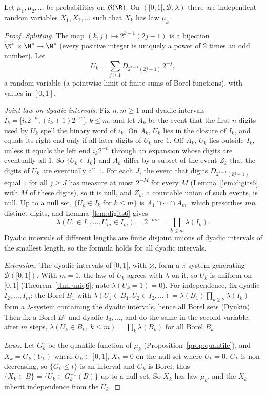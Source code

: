 \begin{theorem}\label{thm:independent}
Let $\mu_1,\mu_2,\ldots$ be probabilities on $\mathcal B(\R)$. On $([0,1[,\mathcal B,\lambda)$ there are independent random variables $X_1,X_2,\ldots$ such that $X_k$ has law $\mu_k$.
\end{theorem}
\begin{proof}
\emph{Splitting.} The map $(k,j)\mapsto2^{k-1}(2j-1)$ is a bijection $\N^*\times\N^*\to\N^*$ (every positive integer is uniquely a power of $2$ times an odd number). Let
\[U_k=\sum_{j\ge1}D_{2^{k-1}(2j-1)}\,2^{-j},\]
a random variable (a pointwise limit of finite sums of Borel functions), with values in $[0,1]$.

\emph{Joint law on dyadic intervals.} Fix $n,m\ge1$ and dyadic intervals $I_k=[i_k2^{-n},(i_k+1)2^{-n}[$, $k\le m$, and let $A_k$ be the event that the first $n$ digits used by $U_k$
spell the binary word of $i_k$. On $A_k$, $U_k$ lies in the closure of $I_k$, and equals its right end only if all later digits of $U_k$ are $1$. Off $A_k$, $U_k$ lies outside $I_k$, unless
it equals the left end $i_k2^{-n}$ through an expansion whose digits are eventually all $1$. So $\{U_k\in I_k\}$ and $A_k$ differ by a subset of the event $Z_k$ that the digits of $U_k$ are
eventually all $1$. For each $J$, the event that digits $D_{2^{k-1}(2j-1)}$ equal $1$ for all $j\ge J$ has measure at most $2^{-M}$ for every $M$ (Lemma~\ref{lem:digits6}, with $M$ of these digits),
so it is null, and $Z_k$, a countable union of such events, is null. Up to a null set, $\{U_k\in I_k\text{ for }k\le m\}$ is $A_1\cap\cdots\cap A_m$, which prescribes $mn$ distinct digits, and Lemma~\ref{lem:digits6} gives
\[\lambda(U_1\in I_1,\dots,U_m\in I_m)=2^{-mn}=\prod_{k\le m}\lambda(I_k).\]
Dyadic intervals of different lengths are finite disjoint unions of dyadic intervals of the smallest length, so the formula holds for all dyadic intervals.

\emph{Extension.} The dyadic intervals of $[0,1[$, with $\varnothing$, form a $\pi$-system generating $\mathcal B([0,1[)$. With $m=1$, the law of $U_k$ agrees with $\lambda$ on it, so $U_k$ is
uniform on $[0,1[$ (Theorem~\ref{thm:uniq6}; note $\lambda(U_k=1)=0$). For independence, fix dyadic $I_2,\dots,I_m$: the Borel $B_1$ with $\lambda(U_1\in B_1,U_2\in I_2,\dots)=\lambda(B_1)\prod_{k\ge2}\lambda(I_k)$
form a $\lambda$-system containing the dyadic intervals, hence all Borel sets (Dynkin). Then fix a Borel $B_1$ and dyadic $I_3,\dots$, and do the same in the second
variable; after $m$ steps, $\lambda(U_k\in B_k,\ k\le m)=\prod_k\lambda(B_k)$ for all Borel $B_k$.

\emph{Laws.} Let $G_k$ be the quantile function of $\mu_k$ (Proposition~\ref{prop:quantile}), and $X_k=G_k(U_k)$ where $U_k\in\,]0,1[$, $X_k=0$ on the null set where $U_k=0$. $G_k$ is non-decreasing, so
$\{G_k\le t\}$ is an interval and $G_k$ is Borel; thus $\{X_k\in B\}=\{U_k\in G_k^{-1}(B)\}$ up to a null set. So $X_k$ has law $\mu_k$, and the $X_k$ inherit independence from the $U_k$.
\end{proof}


